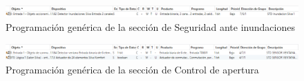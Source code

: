 \begin{landscape}
\begin{figure}[H]
\includegraphics[width=1.55\textwidth]{figures/prog_inun.png}   
\caption{Programación genérica de la sección de Seguridad ante inundaciones}
\label{fig:prog_inun}
\end{figure}
 \vspace{2cm}

\begin{figure}[H]
\includegraphics[width=1.55\textwidth]{figures/prog_vent.png}   
\caption{Programación genérica de la sección de Control de apertura}
\label{fig:prog_vent}
\end{figure}
\end{landscape}


